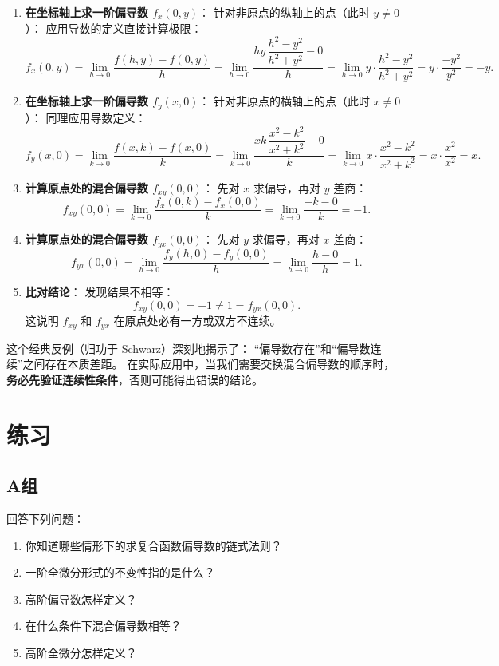 \documentclass[lang=cn,11pt]{elegantbook}
\begin{document}
\begin{solution}
\begin{enumerate}
  \item \textbf{在坐标轴上求一阶偏导数 $f_x(0,y)$}：
  针对非原点的纵轴上的点（此时 $y\neq 0$）：
  应用导数的定义直接计算极限：
  \[
  f_x(0,y)=\lim_{h\to 0}\frac{f(h,y)-f(0,y)}{h}
  =\lim_{h\to 0}\frac{hy\,\dfrac{h^2-y^2}{h^2+y^2}-0}{h}
  =\lim_{h\to 0} y\cdot\frac{h^2-y^2}{h^2+y^2} = y\cdot\frac{-y^2}{y^2}=-y.
  \]

  \item \textbf{在坐标轴上求一阶偏导数 $f_y(x,0)$}：
  针对非原点的横轴上的点（此时 $x\neq 0$）：
  同理应用导数定义：
  \[
  f_y(x,0)=\lim_{k\to 0}\frac{f(x,k)-f(x,0)}{k}
  =\lim_{k\to 0}\frac{xk\,\dfrac{x^2-k^2}{x^2+k^2}-0}{k}
  =\lim_{k\to 0} x\cdot\frac{x^2-k^2}{x^2+k^2} = x\cdot\frac{x^2}{x^2}=x.
  \]

  \item \textbf{计算原点处的混合偏导数 $f_{xy}(0,0)$}：
  先对 $x$ 求偏导，再对 $y$ 差商：
  \[
  f_{xy}(0,0)=\lim_{k\to 0}\frac{f_x(0,k)-f_x(0,0)}{k}
  =\lim_{k\to 0}\frac{-k-0}{k}=-1.
  \]

  \item \textbf{计算原点处的混合偏导数 $f_{yx}(0,0)$}：
  先对 $y$ 求偏导，再对 $x$ 差商：
  \[
  f_{yx}(0,0)=\lim_{h\to 0}\frac{f_y(h,0)-f_y(0,0)}{h}
  =\lim_{h\to 0}\frac{h-0}{h}=1.
  \]

  \item \textbf{比对结论}：
  发现结果不相等：
  \[
  \boxed{f_{xy}(0,0)=-1\neq 1=f_{yx}(0,0)}.
  \]
  这说明 $f_{xy}$ 和 $f_{yx}$ 在原点处必有一方或双方不连续。
\end{enumerate}
\end{solution}

\begin{remark}[反例的启示]
这个经典反例（归功于 Schwarz）深刻地揭示了：
“偏导数存在”和“偏导数连续”之间存在本质差距。
在实际应用中，当我们需要交换混合偏导数的顺序时，
\textbf{务必先验证连续性条件}，否则可能得出错误的结论。
\end{remark}


\section{练习}

\subsection{A组}

\begin{exercise}[基本概念问答]
回答下列问题：
\begin{enumerate}
  \item[(1)] 你知道哪些情形下的求复合函数偏导数的链式法则？
  \item[(2)] 一阶全微分形式的不变性指的是什么？
  \item[(3)] 高阶偏导数怎样定义？
  \item[(4)] 在什么条件下混合偏导数相等？
  \item[(5)] 高阶全微分怎样定义？
\end{enumerate}
\end{exercise}
\end{document}
